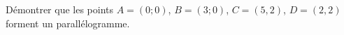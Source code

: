 
\begin{exercice}\label{exosmath-0104}

    Démontrer que les points \( A=(0;0)\), \( B=(3;0)\), \( C=(5,2)\), \( D=(2,2)\) forment un parallélogramme.

\end{exercice}
